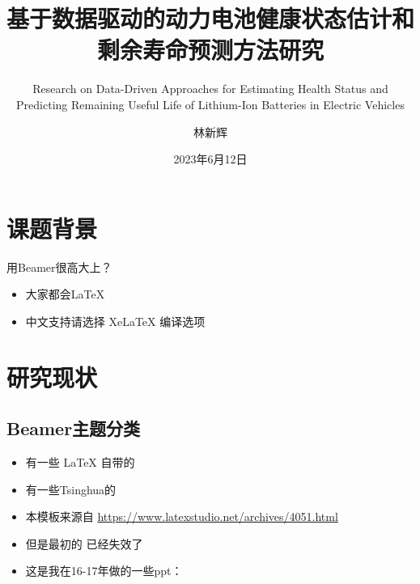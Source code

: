 \documentclass{beamer}
\author{林新辉}
\title{基于数据驱动的动力电池健康状态估计和剩余寿命预测方法研究}
\subtitle{Research on Data-Driven Approaches for Estimating Health Status and Predicting Remaining Useful Life of Lithium-Ion Batteries in Electric Vehicles}
\institute{控制与计算机工程学院，华北电力大学}
\date{2023年6月12日}
\begin{document}
\kaishu
\begin{frame}
	\titlepage
\end{frame}
\begin{frame}
\tableofcontents[sectionstyle=show,subsectionstyle=show/shaded/hide,subsubsectionstyle=show/shaded/hide]
\end{frame}


\section{课题背景}

\begin{frame}{用Beamer很高大上？}
\begin{itemize}
\item 大家都会\LaTeX{}
\item 中文支持请选择 Xe\LaTeX{} 编译选项
\end{itemize}
\end{frame}

\section{研究现状}

\subsection{Beamer主题分类}

\begin{frame}
\begin{itemize}
\item 有一些 \LaTeX{} 自带的
\item 有一些Tsinghua的
\item 本模板来源自 \newline \url{https://www.latexstudio.net/archives/4051.html}
\item 但是最初的 \href{http://far.tooold.cn/post/latex/beamertsinghua}{\color{purple}{link}} \cite{origin}已经失效了
\item 这是我在16-17年做的一些ppt：\href{https://github.com/Trinkle23897/oi_slides}{\color{purple}{戳我}}
\end{itemize}
\end{frame}
\end{document}
